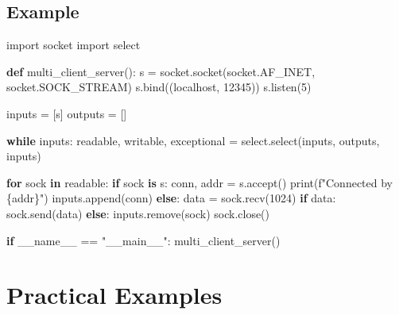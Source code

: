 \documentclass[
  letterpaper,
  DIV=11,
  numbers=noendperiod]{scrreprt}
\newenvironment{Shaded}{\begin{snugshade}}{\end{snugshade}}
\newcommand{\BuiltInTok}[1]{\textcolor[rgb]{0.00,0.23,0.31}{#1}}
\newcommand{\ControlFlowTok}[1]{\textcolor[rgb]{0.00,0.23,0.31}{\textbf{#1}}}
\newcommand{\DecValTok}[1]{\textcolor[rgb]{0.68,0.00,0.00}{#1}}
\newcommand{\ImportTok}[1]{\textcolor[rgb]{0.00,0.46,0.62}{#1}}
\newcommand{\KeywordTok}[1]{\textcolor[rgb]{0.00,0.23,0.31}{\textbf{#1}}}
\newcommand{\NormalTok}[1]{\textcolor[rgb]{0.00,0.23,0.31}{#1}}
\newcommand{\OperatorTok}[1]{\textcolor[rgb]{0.37,0.37,0.37}{#1}}
\newcommand{\SpecialCharTok}[1]{\textcolor[rgb]{0.37,0.37,0.37}{#1}}
\newcommand{\SpecialStringTok}[1]{\textcolor[rgb]{0.13,0.47,0.30}{#1}}
\newcommand{\StringTok}[1]{\textcolor[rgb]{0.13,0.47,0.30}{#1}}
\newcommand{\VariableTok}[1]{\textcolor[rgb]{0.07,0.07,0.07}{#1}}
\begin{document}
\subsection{Example}\label{example-16}

\begin{Shaded}
\begin{Highlighting}[]
\ImportTok{import}\NormalTok{ socket}
\ImportTok{import}\NormalTok{ select}

\KeywordTok{def}\NormalTok{ multi\_client\_server():}
\NormalTok{    s }\OperatorTok{=}\NormalTok{ socket.socket(socket.AF\_INET, socket.SOCK\_STREAM)}
\NormalTok{    s.bind((}\StringTok{\textquotesingle{}localhost\textquotesingle{}}\NormalTok{, }\DecValTok{12345}\NormalTok{))}
\NormalTok{    s.listen(}\DecValTok{5}\NormalTok{)}
    
\NormalTok{    inputs }\OperatorTok{=}\NormalTok{ [s]}
\NormalTok{    outputs }\OperatorTok{=}\NormalTok{ []}
    
    \ControlFlowTok{while}\NormalTok{ inputs:}
\NormalTok{        readable, writable, exceptional }\OperatorTok{=}\NormalTok{ select.select(inputs, outputs, inputs)}
        
        \ControlFlowTok{for}\NormalTok{ sock }\KeywordTok{in}\NormalTok{ readable:}
            \ControlFlowTok{if}\NormalTok{ sock }\KeywordTok{is}\NormalTok{ s:}
\NormalTok{                conn, addr }\OperatorTok{=}\NormalTok{ s.accept()}
                \BuiltInTok{print}\NormalTok{(}\SpecialStringTok{f"Connected by }\SpecialCharTok{\{}\NormalTok{addr}\SpecialCharTok{\}}\SpecialStringTok{"}\NormalTok{)}
\NormalTok{                inputs.append(conn)}
            \ControlFlowTok{else}\NormalTok{:}
\NormalTok{                data }\OperatorTok{=}\NormalTok{ sock.recv(}\DecValTok{1024}\NormalTok{)}
                \ControlFlowTok{if}\NormalTok{ data:}
\NormalTok{                    sock.send(data)}
                \ControlFlowTok{else}\NormalTok{:}
\NormalTok{                    inputs.remove(sock)}
\NormalTok{                    sock.close()}

\ControlFlowTok{if} \VariableTok{\_\_name\_\_} \OperatorTok{==} \StringTok{"\_\_main\_\_"}\NormalTok{:}
\NormalTok{    multi\_client\_server()}
\end{Highlighting}
\end{Shaded}

\section{Practical Examples}\label{practical-examples-4}
\end{document}
